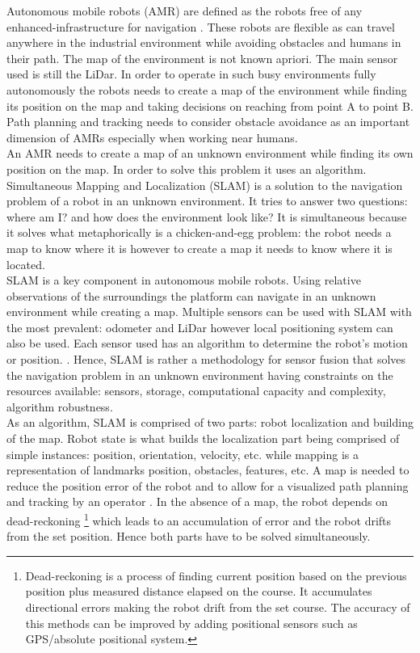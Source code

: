 Autonomous mobile robots (AMR) are defined as the robots free of any enhanced-infrastructure for navigation \cite{agv}. These robots are flexible as can travel anywhere in the industrial environment while avoiding obstacles and humans in their path. The map of the environment is not known apriori. The main sensor used is still the LiDar. In order to operate in such busy environments fully autonomously the robots needs to create a map of the environment while finding its position on the map and taking decisions on reaching from point A to point B. Path planning and tracking needs to consider obstacle avoidance as an important dimension of AMRs especially when working near humans.\\

An AMR needs to create a map of an unknown environment while finding its own position on the map. In order to solve this problem it uses an algorithm. Simultaneous Mapping and Localization (SLAM) is a solution to the navigation problem of a robot in an unknown environment. It tries to answer two questions: where am I? and how does the environment look like? It is simultaneous because it solves what metaphorically is a chicken-and-egg problem: the robot needs a map to know where it is however to create a map it needs to know where it is located.\\

SLAM is a key component in autonomous mobile robots. Using relative observations of the surroundings the platform can navigate in an unknown environment while creating a map. Multiple sensors can be used with SLAM with the most prevalent: odometer and LiDar however local positioning system can also be used. Each sensor used has an algorithm to determine the robot's motion or position. \cite{agv}. Hence, SLAM is rather a methodology for sensor fusion that solves the navigation problem in an unknown environment having constraints on the resources available: sensors, storage, computational capacity and complexity, algorithm robustness.\\

As an algorithm, SLAM is comprised of two parts: robot localization and building of the map. Robot state is what builds the localization part being comprised of simple instances: position, orientation, velocity, etc. while mapping is a representation of landmarks position, obstacles, features, etc. A map is needed to reduce the position error of the robot and to allow for a visualized path planning and tracking by an operator \cite{past}. In the absence of a map, the robot depends on dead-reckoning \footnote{Dead-reckoning is a process of finding current position based on the previous position plus measured distance elapsed on the course. It accumulates directional errors making the robot drift from the set course. The accuracy of this methods can be improved by adding positional sensors such as GPS/absolute positional system.} which leads to an accumulation of error and the robot drifts from the set position. Hence both parts have to be solved simultaneously. \\

